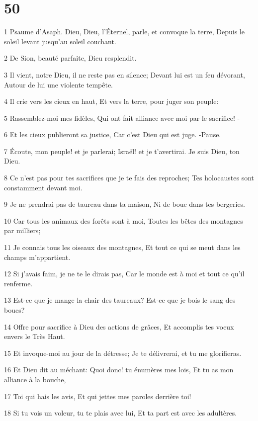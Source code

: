 \chapter{50}

\par 1 Psaume d'Asaph. Dieu, Dieu, l'Éternel, parle, et convoque la terre, Depuis le soleil levant jusqu'au soleil couchant.
\par 2 De Sion, beauté parfaite, Dieu resplendit.
\par 3 Il vient, notre Dieu, il ne reste pas en silence; Devant lui est un feu dévorant, Autour de lui une violente tempête.
\par 4 Il crie vers les cieux en haut, Et vers la terre, pour juger son peuple:
\par 5 Rassemblez-moi mes fidèles, Qui ont fait alliance avec moi par le sacrifice! -
\par 6 Et les cieux publieront sa justice, Car c'est Dieu qui est juge. -Pause.
\par 7 Écoute, mon peuple! et je parlerai; Israël! et je t'avertirai. Je suis Dieu, ton Dieu.
\par 8 Ce n'est pas pour tes sacrifices que je te fais des reproches; Tes holocaustes sont constamment devant moi.
\par 9 Je ne prendrai pas de taureau dans ta maison, Ni de bouc dans tes bergeries.
\par 10 Car tous les animaux des forêts sont à moi, Toutes les bêtes des montagnes par milliers;
\par 11 Je connais tous les oiseaux des montagnes, Et tout ce qui se meut dans les champs m'appartient.
\par 12 Si j'avais faim, je ne te le dirais pas, Car le monde est à moi et tout ce qu'il renferme.
\par 13 Est-ce que je mange la chair des taureaux? Est-ce que je bois le sang des boucs?
\par 14 Offre pour sacrifice à Dieu des actions de grâces, Et accomplis tes voeux envers le Très Haut.
\par 15 Et invoque-moi au jour de la détresse; Je te délivrerai, et tu me glorifieras.
\par 16 Et Dieu dit au méchant: Quoi donc! tu énumères mes lois, Et tu as mon alliance à la bouche,
\par 17 Toi qui hais les avis, Et qui jettes mes paroles derrière toi!
\par 18 Si tu vois un voleur, tu te plais avec lui, Et ta part est avec les adultères.
